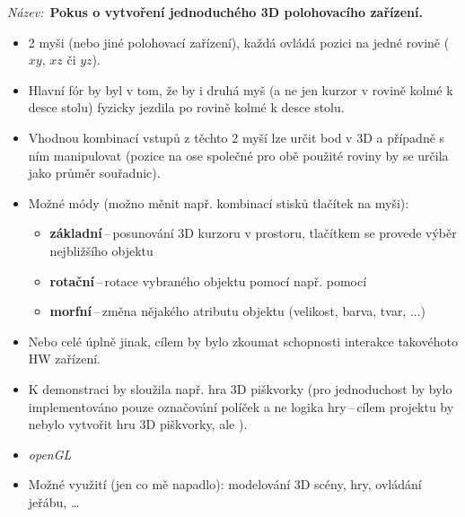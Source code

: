 \documentclass[a4paper,12pt,titlepage]{article}
\begin{document}
{\it Název:}~{\bf Pokus o vytvoření jednoduchého 3D polohovacího zařízení.}
\begin{itemize}
\item{2 myši (nebo jiné polohovací zařízení), každá ovládá pozici na jedné
      rovině ($xy$, $xz$ či $yz$).}
\item{Hlavní fór by byl v tom, že by i druhá myš (a ne jen kurzor v rovině kolmé
      k desce stolu) fyzicky jezdila po rovině kolmé k desce stolu.}
\item{Vhodnou kombinací vstupů z těchto 2 myší lze určit bod v 3D a případně
      s ním manipulovat (pozice na ose společné pro obě použité roviny
      by se určila jako průměr souřadnic).}
\item{Možné módy (možno měnit např. kombinací stisků tlačítek na myši):}
    \begin{itemize}
    \item{{\bf základní}\,--\,posunování 3D kurzoru v prostoru,
            tlačítkem se provede výběr nejbližšího objektu}
    \item{{\bf rotační}\,--\,rotace vybraného objektu pomocí např. pomocí
            }
    \item{{\bf morfní}\,--\,změna nějakého atributu objektu
            (velikost, barva, tvar, ...)}
    \end{itemize}
\item{Nebo celé úplně jinak, cílem by bylo zkoumat schopnosti interakce
        takovéhoto HW zařízení.}
\item{K demonstraci by sloužila např. hra 3D piškvorky (pro jednoduchost
        by bylo implementováno pouze označování políček a ne logika
        hry\,--\,cílem projektu by nebylo vytvořit hru 3D piškvorky,
        ale ).}
\item{{\it openGL}}
\item{Možné využití (jen co mě napadlo): modelování 3D scény, hry,
        ovládání jeřábu, \ldots}
\end{itemize}

% 
% 
\end{document}
